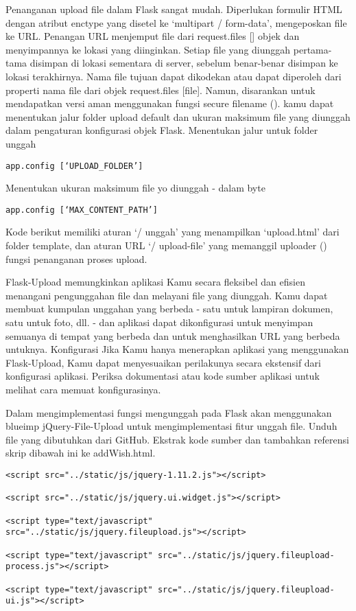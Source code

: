 \documentclass[12pt,a4paper]{article}
\begin{document}
Penanganan upload file dalam Flask sangat mudah. Diperlukan formulir HTML dengan atribut enctype yang disetel ke ‘multipart / form-data’, mengeposkan file ke URL. Penangan URL menjemput file dari request.files [] objek dan menyimpannya ke lokasi yang diinginkan.
	Setiap file yang diunggah pertama-tama disimpan di lokasi sementara di server, sebelum benar-benar disimpan ke lokasi terakhirnya. Nama file tujuan dapat dikodekan atau dapat diperoleh dari properti nama file dari objek request.files [file]. Namun, disarankan untuk mendapatkan versi aman menggunakan fungsi secure filename ().
kamu dapat menentukan jalur folder upload default dan ukuran maksimum file yang diunggah dalam pengaturan konfigurasi objek Flask.
Menentukan jalur untuk folder unggah
\begin{verbatim}
app.config [‘UPLOAD_FOLDER’] 
\end{verbatim}
Menentukan ukuran maksimum file yo diunggah - dalam byte
\begin{verbatim}
app.config [‘MAX_CONTENT_PATH’] 
\end{verbatim}
Kode berikut memiliki aturan ‘/ unggah’ yang menampilkan ‘upload.html’ dari folder template, dan aturan URL ‘/ upload-file’ yang memanggil uploader () fungsi penanganan proses upload.

Flask-Upload memungkinkan aplikasi Kamu secara fleksibel dan efisien menangani pengunggahan file dan melayani file yang diunggah. Kamu dapat membuat kumpulan unggahan yang berbeda - satu untuk lampiran dokumen, satu untuk foto, dll. - dan aplikasi dapat dikonfigurasi untuk menyimpan semuanya di tempat yang berbeda dan untuk menghasilkan URL yang berbeda untuknya.
Konfigurasi
Jika Kamu hanya menerapkan aplikasi yang menggunakan Flask-Upload, Kamu dapat menyesuaikan perilakunya secara ekstensif dari konfigurasi aplikasi. Periksa dokumentasi atau kode sumber aplikasi untuk melihat cara memuat konfigurasinya.


Dalam mengimplementasi fungsi mengunggah pada Flask akan menggunakan blueimp jQuery-File-Upload untuk mengimplementasi fitur unggah file. Unduh file yang dibutuhkan dari GitHub. Ekstrak kode sumber dan tambahkan referensi skrip dibawah ini ke addWish.html.
\begin{verbatim}
<script src="../static/js/jquery-1.11.2.js"></script>
 
<script src="../static/js/jquery.ui.widget.js"></script>
 
<script type="text/javascript" src="../static/js/jquery.fileupload.js"></script>
 
<script type="text/javascript" src="../static/js/jquery.fileupload-process.js"></script>
 
<script type="text/javascript" src="../static/js/jquery.fileupload-ui.js"></script>
\end{verbatim}
\end{document}
